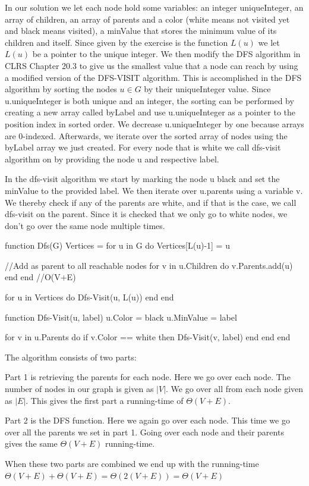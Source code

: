 \documentclass{article}
\begin{document}
In our solution we let each node hold some variables: an integer uniqueInteger, an array of children, an array of parents and a color (white means not visited yet and black means visited), a minValue that stores the minimum value of its children and itself.
Since given by the exercise is the function $L(u)$ we let $L(u)$ be a pointer to the unique integer. 
We then modify the DFS algorithm in CLRS Chapter 20.3 to give us the smallest value that a node can reach by using a modified version of the DFS-VISIT algorithm. This is accomplished in the DFS algorithm by sorting the nodes $u \in G$ by their uniqueInteger value. Since u.uniqueInteger is both unique and an integer, the sorting can be performed by creating a new array called byLabel and use u.uniqueInteger as a pointer to the position index in sorted order. We decrease u.uniqueInteger by one because arrays are 0-indexed.
Afterwards, we iterate over the sorted array of nodes using the byLabel array we just created. For every node that is white we call dfs-visit algorithm on by providing the node u and respective label.

In the dfs-visit algorithm we start by marking the node u black and set the minValue to the provided label. We then iterate over u.parents using a variable v. We thereby check if any of the parents are white, and if that is the case, we call dfs-visit on the parent. Since it is checked that we only go to white nodes, we don't go over the same node multiple times.

\begin{pseudo}
	function Dfs(G)
	Vertices = {}
	for u in G do
	Vertices[L(u)-1] = u

		//Add as parent to all reachable nodes
		for v in u.Children do
			v.Parents.add(u)
		end
	end //O(V+E)

	for u in Vertices do
	Dfs-Visit(u, L(u))
	end
	end
\end{pseudo}

\begin{pseudo}
	function Dfs-Visit(u, label)
	u.Color = black
	u.MinValue = label

	for v in u.Parents do
	if v.Color == white then
	Dfs-Visit(v, label)
	end
	end
	end
\end{pseudo}
The algorithm consists of two parts:

Part 1 is retrieving the parents for each node. Here we go over each node. The number of nodes in our graph is given as $|V|$. We go over all from each node given as $|E|$. This gives the first part a running-time of $\Theta(V+E)$.

Part 2 is the DFS function. Here we again go over each node. This time we go over all the parents we set in part 1. Going over each node and their parents gives the same $\Theta(V+E)$ running-time.

When these two parts are combined we end up with the running-time $\Theta(V+E) + \Theta(V+E) = \Theta(2(V+E)) = \Theta(V+E)$
\end{document}
